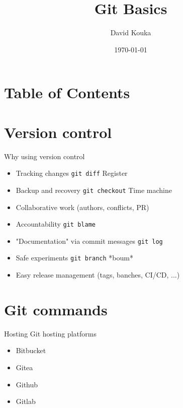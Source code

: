 \documentclass{beamer}
\title{Git Basics}
\author{David Kouka}
\date{\today}
\begin{document}
\frame{\titlepage}  %

\section{Table of Contents}

\begin{frame}
\tableofcontents
\end{frame}

\section{Version control}

\begin{frame}{Why using version control}
    \begin{itemize}
        \item<1-> Tracking changes \lstinline{git diff} Register
        \item<2-> Backup and recovery \lstinline{git checkout} Time machine
        \item<3-> Collaborative work (authors, conflicts, PR)
        \item<4-> Accountability \lstinline{git blame}
        \item<5-> "Documentation" via commit messages \lstinline{git log}
        \item<6-> Safe experiments \lstinline{git branch} *boum*
        \item<7-> Easy release management (tags, banches, CI/CD, ...)
    \end{itemize}
\end{frame}

\section{Git commands}

\begin{frame}{Hosting}
     Git hosting platforms
    \begin{itemize}
        \item<2-> Bitbucket 
        \item<3-> Gitea
        \item<4-> Github
        \item<5-> Gitlab
    \end{itemize}
\end{frame}
\end{document}
